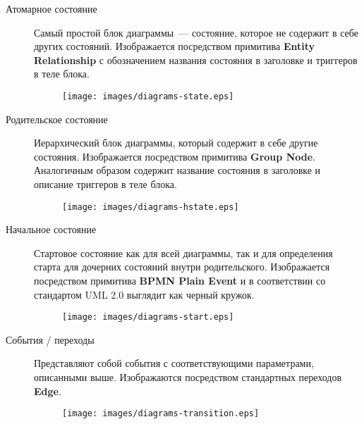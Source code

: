 \documentclass[12pt,a4paper]{article}
\begin{document}
\begin{description}
\item[Атомарное состояние] Самый простой блок диаграммы~--- состояние, которое не содержит
  в себе других состояний. Изображается посредством примитива \textbf{Entity Relationship}
  с обозначением названия состояния в заголовке и триггеров в теле блока.

\begin{figure}[h]
  \begin{center}
    \texttt{[image: images/diagrams-state.eps]}
  \end{center}
\end{figure}

\item[Родительское состояние] Иерархический блок диаграммы, который содержит в себе другие
  состояния. Изображается посредством примитива \textbf{Group Node}. Аналогичным образом
  содержит название состояния в заголовке и описание триггеров в теле блока.

\begin{figure}[h]
  \begin{center}
    \texttt{[image: images/diagrams-hstate.eps]}
  \end{center}
\end{figure}

\item[Начальное состояние] Стартовое состояние как для всей диаграммы, так и для
  определения старта для дочерних состояний внутри родительского. Изображается посредством
  примитива \textbf{BPMN Plain Event} и в соответствии со стандартом UML 2.0 выглядит как
  черный кружок.
  
\begin{figure}[h]
  \begin{center}
    \texttt{[image: images/diagrams-start.eps]}
  \end{center}
\end{figure}
  
\item[События / переходы] Представляют собой события с соответствующими параметрами,
  описанными выше. Изображаются посредством стандартных переходов \textbf{Edge}.

\begin{figure}[h]
  \begin{center}
    \texttt{[image: images/diagrams-transition.eps]}
  \end{center}
\end{figure}
  

\end{description}
\end{document}

